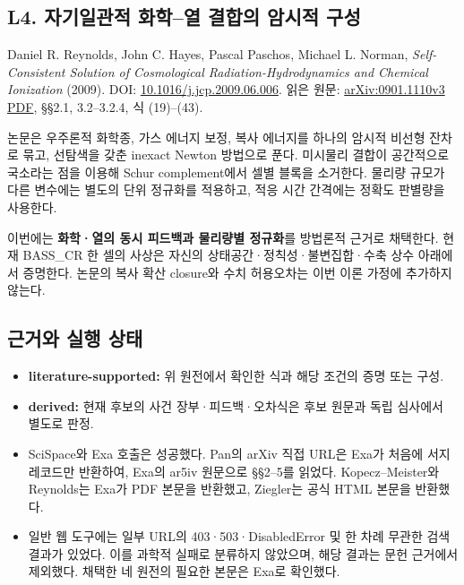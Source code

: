 \hypertarget{l4.-uxc790uxae30uxc77cuxad00uxc801-uxd654uxd559uxc5f4-uxacb0uxd569uxc758-uxc554uxc2dcuxc801-uxad6cuxc131}{%
\subsection{L4. 자기일관적 화학--열 결합의 암시적 구성}\label{l4.-uxc790uxae30uxc77cuxad00uxc801-uxd654uxd559uxc5f4-uxacb0uxd569uxc758-uxc554uxc2dcuxc801-uxad6cuxc131}}

Daniel R. Reynolds, John C. Hayes, Pascal Paschos, Michael L. Norman, \emph{Self-Consistent Solution of Cosmological Radiation-Hydrodynamics and Chemical Ionization} (2009). DOI: \href{https://doi.org/10.1016/j.jcp.2009.06.006}{10.1016/j.jcp.2009.06.006}. 읽은 원문: \href{https://arxiv.org/pdf/0901.1110}{arXiv:0901.1110v3 PDF}, §§2.1, 3.2--3.2.4, 식 (19)--(43).

논문은 우주론적 화학종, 가스 에너지 보정, 복사 에너지를 하나의 암시적 비선형 잔차로 묶고, 선탐색을 갖춘 inexact Newton 방법으로 푼다. 미시물리 결합이 공간적으로 국소라는 점을 이용해 Schur complement에서 셀별 블록을 소거한다. 물리량 규모가 다른 변수에는 별도의 단위 정규화를 적용하고, 적응 시간 간격에는 정확도 판별량을 사용한다.

이번에는 \textbf{화학·열의 동시 피드백과 물리량별 정규화}를 방법론적 근거로 채택한다. 현재 BASS\_CR 한 셀의 사상은 자신의 상태공간·정칙성·불변집합·수축 상수 아래에서 증명한다. 논문의 복사 확산 closure와 수치 허용오차는 이번 이론 가정에 추가하지 않는다.

\hypertarget{uxadfcuxac70uxc640-uxc2e4uxd589-uxc0c1uxd0dc}{%
\subsection{근거와 실행 상태}\label{uxadfcuxac70uxc640-uxc2e4uxd589-uxc0c1uxd0dc}}

\begin{itemize}
\tightlist
\item
  \textbf{literature-supported:} 위 원전에서 확인한 식과 해당 조건의 증명 또는 구성.
\item
  \textbf{derived:} 현재 후보의 사건 장부·피드백·오차식은 후보 원문과 독립 심사에서 별도로 판정.
\item
  SciSpace와 Exa 호출은 성공했다. Pan의 arXiv 직접 URL은 Exa가 처음에 서지 레코드만 반환하여, Exa의 ar5iv 원문으로 §§2--5를 읽었다. Kopecz--Meister와 Reynolds는 Exa가 PDF 본문을 반환했고, Ziegler는 공식 HTML 본문을 반환했다.
\item
  일반 웹 도구에는 일부 URL의 403·503·DisabledError 및 한 차례 무관한 검색 결과가 있었다. 이를 과학적 실패로 분류하지 않았으며, 해당 결과는 문헌 근거에서 제외했다. 채택한 네 원전의 필요한 본문은 Exa로 확인했다.
\end{itemize}


